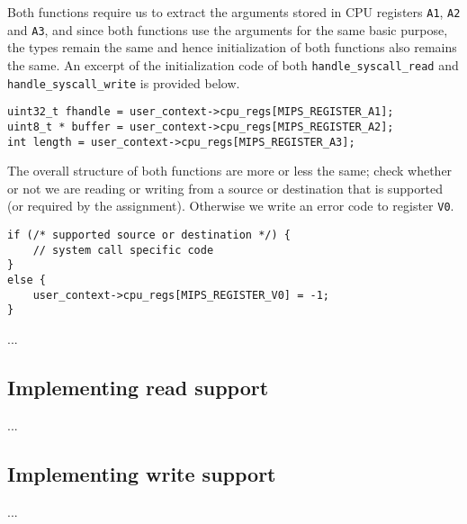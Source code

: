 \documentclass[11pt]{article}
\newcommand{\code}[1]{{\tt #1}}
\begin{document}
Both functions require us to extract the arguments stored in CPU registers
\code{A1}, \code{A2} and \code{A3}, and since both functions use the arguments
for the same basic purpose, the types remain the same and hence initialization
of both functions also remains the same. An excerpt of the initialization code
of both \code{handle\_syscall\_read} and \code{handle\_syscall\_write} is
provided below.

\begin{lstlisting}
uint32_t fhandle = user_context->cpu_regs[MIPS_REGISTER_A1];
uint8_t * buffer = user_context->cpu_regs[MIPS_REGISTER_A2];
int length = user_context->cpu_regs[MIPS_REGISTER_A3];
\end{lstlisting}

The overall structure of both functions are more or less the same; check
whether or not we are reading or writing from a source or destination that is
supported (or required by the assignment). Otherwise we write an error code to
register \code{V0}.

\begin{lstlisting}
if (/* supported source or destination */) {
    // system call specific code
}
else {
    user_context->cpu_regs[MIPS_REGISTER_V0] = -1;
}
\end{lstlisting}

...

\subsection{Implementing read support}
...

\subsection{Implementing write support}
...
\end{document}

